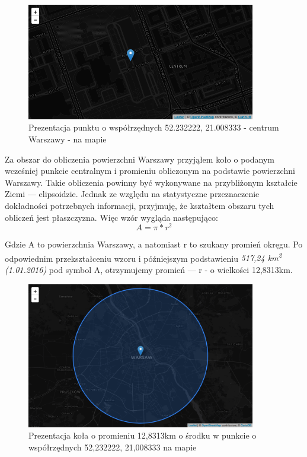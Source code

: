 \begin{figure}[h!]
  \centering
    \includegraphics[width=10cm]{images/warsaw-center}
  \caption{Prezentacja punktu o współrzędnych 52.232222, 21.008333 - centrum Warszawy - na mapie}
  \label{fig:warsawCenter}
\end{figure}


Za obszar do obliczenia powierzchni Warszawy przyjąłem koło o podanym wcześniej punkcie centralnym i promieniu obliczonym na podstawie powierzchni Warszawy.\cite{WarszawaWiki} Takie obliczenia powinny być wykonywane na przybliżonym kształcie Ziemi — elipsoidzie. Jednak ze względu na statystyczne przeznaczenie dokładności potrzebnych informacji, przyjmuję, że kształtem obszaru tych obliczeń jest płaszczyzna. Więc wzór wygląda następująco:
\[ A=\pi*r^2 \]

Gdzie A to powierzchnia Warszawy, a natomiast r to szukany promień okręgu. Po odpowiednim przekształceniu wzoru i późniejszym podstawieniu \textit{517,24 km\textsuperscript{2} (1.01.2016)}\cite{WarszawaWiki} pod symbol A, otrzymujemy promień — r - o wielkości 12,8313km.


\begin{figure}[h!]
  \centering
    \includegraphics[width=10cm]{images/warsaw-10km-radius}
  \caption{Prezentacja koła o promieniu 12,8313km o środku w punkcie o współrzędnych 52,232222, 21,008333 na mapie}
  \label{fig:warsaw10kmRadius}
\end{figure}

